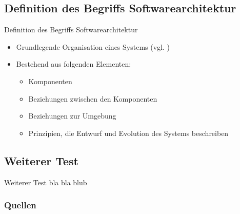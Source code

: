 \documentclass{beamer}
\begin{document}
		\subsection{Definition des Begriffs Softwarearchitektur}
			\begin{frame}{Definition des Begriffs Softwarearchitektur}
				\begin{itemize}
					\item Grundlegende Organisation eines Systems (vgl. \cite{gi-lexikon})
					\item Bestehend aus folgenden Elementen:
					\begin{itemize}
						\item Komponenten
						\item Beziehungen zwischen den Komponenten
						\item Beziehungen zur Umgebung
						\item Prinzipien, die Entwurf und Evolution des Systems beschreiben
					\end{itemize}
				\end{itemize}
			\end{frame}
		\subsection{Weiterer Test}
			\begin{frame}{Weiterer Test}
				bla bla blub
			\end{frame}
	\begin{frame}[allowframebreaks]
		\frametitle{Quellen}
		\printbibliography[heading=none]
	\end{frame}
\end{document}
